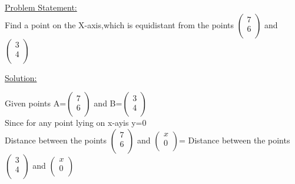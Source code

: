 \documentclass[10pt,a4paper]{report}
\begin{document}
\begin{multicols}{2}

\raggedright \large \underline{Problem Statement:} \normalsize \vspace{5mm}
\\ \hspace{2cm} Find a point on the X-axis,which is equidistant from the points $\begin{pmatrix}
  7 \\
  6 \\
 \end{pmatrix}$ and $\begin{pmatrix}
  3 \\
  4 \\
 \end{pmatrix}$\vspace{3mm} \\ \raggedright \large \underline{Solution:} \normalsize \\ \vspace{2mm} \raggedright Given points
A=$\begin{pmatrix}
  7 \\
  6 \\
 \end{pmatrix}$
 and B=$\begin{pmatrix}
  3 \\
  4 \\
 \end{pmatrix}$                                \vspace{1mm}
\\Since for any point lying on x-ayis y=0\\    \vspace{1mm}
Distance between the points $\begin{pmatrix}
  7 \\
  6 \\
 \end{pmatrix}$ and $\begin{pmatrix}
  x \\
  0 \\
 \end{pmatrix}$= Distance between the points $\begin{pmatrix}
  3 \\
  4 \\
 \end{pmatrix}$ and $\begin{pmatrix}
  x \\
  0 \\
 \end{pmatrix}$\\                              \vspace{1mm}

\end{multicols}
\end{document}
